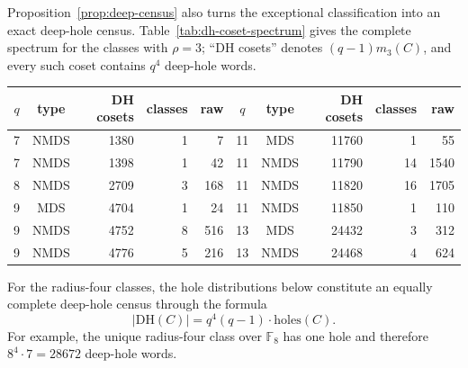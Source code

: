 \documentclass[11pt]{article}
\newcommand{\F}{\mathbb F}
\theoremstyle{plain}
\theoremstyle{definition}
\begin{document}
Proposition~\ref{prop:deep-census} also turns the exceptional classification
into an exact deep-hole census.  Table~\ref{tab:dh-coset-spectrum} gives
the complete spectrum for the classes with \(\rho=3\); ``DH cosets'' denotes
\((q-1)m_3(C)\), and every such coset contains \(q^4\) deep-hole words.
\begin{center}
\label{tab:dh-coset-spectrum}
\small
\begin{tabular}{c c r r r@{\qquad}c c r r r}
\toprule
\(q\)&type&DH cosets&classes&raw&
\(q\)&type&DH cosets&classes&raw\\
\midrule
7  & NMDS & 1380  & 1  & 7    & 11 & MDS  & 11760 & 1  & 55\\
7  & NMDS & 1398  & 1  & 42   & 11 & NMDS & 11790 & 14 & 1540\\
8  & NMDS & 2709  & 3  & 168  & 11 & NMDS & 11820 & 16 & 1705\\
9  & MDS  & 4704  & 1  & 24   & 11 & NMDS & 11850 & 1  & 110\\
9  & NMDS & 4752  & 8  & 516  & 13 & MDS  & 24432 & 3  & 312\\
9  & NMDS & 4776  & 5  & 216  & 13 & NMDS & 24468 & 4  & 624\\
\bottomrule
\end{tabular}
\end{center}
For the radius-four classes, the hole distributions below constitute an
equally complete deep-hole census through the formula
\[
  |\mathrm{DH}(C)|=q^4(q-1)\cdot\mathrm{holes}(C).
\]
For example, the unique radius-four class over \(\F_8\) has one hole and
therefore \(8^4\cdot7=28672\) deep-hole words.
\end{document}
